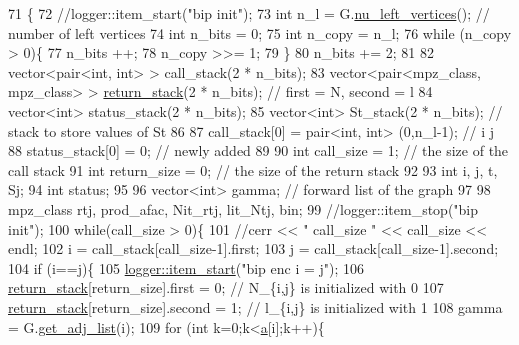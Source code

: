 \begin{DoxyCode}
71                                                                          \{
72   \textcolor{comment}{//logger::item\_start("bip init");}
73   \textcolor{keywordtype}{int} n\_l = G.\hyperlink{classb__graph_a5e71d5c97f2501b0b93c17146cf7e68e}{nu\_left\_vertices}(); \textcolor{comment}{// number of left vertices}
74   \textcolor{keywordtype}{int} n\_bits = 0;
75   \textcolor{keywordtype}{int} n\_copy = n\_l;
76   \textcolor{keywordflow}{while} (n\_copy > 0)\{
77     n\_bits ++;
78     n\_copy >>= 1;
79   \}
80   n\_bits += 2;
81 
82   vector<pair<int, int> > call\_stack(2 * n\_bits);
83   vector<pair<mpz\_class, mpz\_class> > \hyperlink{namespacehelper__vars_a6d2100c373830cacd232319a9958652d}{return\_stack}(2 * n\_bits); \textcolor{comment}{// first = N, second = l}
84   vector<int> status\_stack(2 * n\_bits);
85   vector<int> St\_stack(2 * n\_bits); \textcolor{comment}{// stack to store values of St}
86  
87   call\_stack[0] = pair<int, int> (0,n\_l-1); \textcolor{comment}{// i j }
88   status\_stack[0] = 0; \textcolor{comment}{// newly added}
89  
90   \textcolor{keywordtype}{int} call\_size = 1; \textcolor{comment}{// the size of the call stack}
91   \textcolor{keywordtype}{int} return\_size = 0; \textcolor{comment}{// the size of the return stack}
92 
93   \textcolor{keywordtype}{int} i, j, t, Sj;
94   \textcolor{keywordtype}{int} status;
95  
96   vector<int> gamma; \textcolor{comment}{// forward list  of the graph}
97 
98   mpz\_class rtj, prod\_afac, Nit\_rtj, lit\_Ntj, bin;
99   \textcolor{comment}{//logger::item\_stop("bip init");}
100   \textcolor{keywordflow}{while}(call\_size > 0)\{
101     \textcolor{comment}{//cerr << " call\_size " << call\_size << endl;}
102     i = call\_stack[call\_size-1].first;
103     j = call\_stack[call\_size-1].second;
104     \textcolor{keywordflow}{if} (i==j)\{
105       \hyperlink{classlogger_a7e21ec6ad2d40cfc2c6a383521b5641a}{logger::item\_start}(\textcolor{stringliteral}{"bip enc i = j"});
106       \hyperlink{namespacehelper__vars_a6d2100c373830cacd232319a9958652d}{return\_stack}[return\_size].first = 0; \textcolor{comment}{// N\_\{i,j\} is initialized with 0}
107       \hyperlink{namespacehelper__vars_a6d2100c373830cacd232319a9958652d}{return\_stack}[return\_size].second = 1; \textcolor{comment}{// l\_\{i,j\} is initialized with 1}
108       gamma = G.\hyperlink{classb__graph_aa81c7179b9c6cb4986c4b41e84a85799}{get\_adj\_list}(i);
109       \textcolor{keywordflow}{for} (\textcolor{keywordtype}{int} k=0;k<\hyperlink{classb__graph__encoder_afd22d167f495cd85b41397f337c377c2}{a}[i];k++)\{

\end{DoxyCode}
